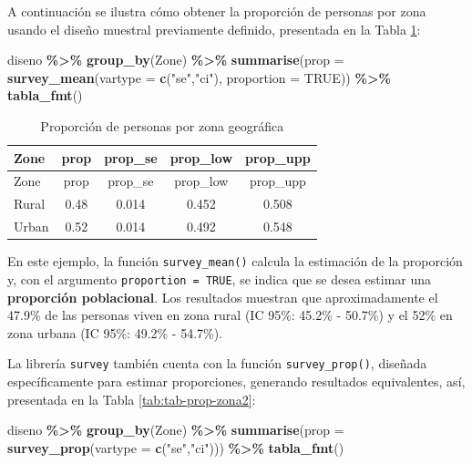 \documentclass[
  spanish,
  12pt,
]{book}
\newenvironment{Shaded}{\begin{snugshade}}{\end{snugshade}}
\newcommand{\AttributeTok}[1]{\textcolor[rgb]{0.13,0.29,0.53}{#1}}
\newcommand{\ConstantTok}[1]{\textcolor[rgb]{0.56,0.35,0.01}{#1}}
\newcommand{\FunctionTok}[1]{\textcolor[rgb]{0.13,0.29,0.53}{\textbf{#1}}}
\newcommand{\NormalTok}[1]{#1}
\newcommand{\SpecialCharTok}[1]{\textcolor[rgb]{0.81,0.36,0.00}{\textbf{#1}}}
\newcommand{\StringTok}[1]{\textcolor[rgb]{0.31,0.60,0.02}{#1}}
\begin{document}
A continuación se ilustra cómo obtener la proporción de personas por zona usando el diseño muestral previamente definido, presentada en la Tabla \ref{tab:tab-prop-zona}:

\begin{Shaded}
\begin{Highlighting}[]
\NormalTok{diseno }\SpecialCharTok{\%\textgreater{}\%} 
  \FunctionTok{group\_by}\NormalTok{(Zone) }\SpecialCharTok{\%\textgreater{}\%} 
  \FunctionTok{summarise}\NormalTok{(}\AttributeTok{prop =} \FunctionTok{survey\_mean}\NormalTok{(}\AttributeTok{vartype =} \FunctionTok{c}\NormalTok{(}\StringTok{"se"}\NormalTok{,}\StringTok{"ci"}\NormalTok{), }
                               \AttributeTok{proportion =} \ConstantTok{TRUE}\NormalTok{)) }\SpecialCharTok{\%\textgreater{}\%}
  \FunctionTok{tabla\_fmt}\NormalTok{()}
\end{Highlighting}
\end{Shaded}

\begin{longtable}[]{@{}lcccc@{}}
\caption{\label{tab:tab-prop-zona}Proporción de personas por zona geográfica}\tabularnewline
\toprule\noalign{}
Zone & prop & prop\_se & prop\_low & prop\_upp \\
\midrule\noalign{}
\endfirsthead
\toprule\noalign{}
Zone & prop & prop\_se & prop\_low & prop\_upp \\
\midrule\noalign{}
\endhead
\bottomrule\noalign{}
\endlastfoot
Rural & 0.48 & 0.014 & 0.452 & 0.508 \\
Urban & 0.52 & 0.014 & 0.492 & 0.548 \\
\end{longtable}

En este ejemplo, la función \texttt{survey\_mean()} calcula la estimación de la proporción y, con el argumento \texttt{proportion\ =\ TRUE}, se indica que se desea estimar una \textbf{proporción poblacional}. Los resultados muestran que aproximadamente el 47.9\% de las personas viven en zona rural (IC 95\%: 45.2\% - 50.7\%) y el 52\% en zona urbana (IC 95\%: 49.2\% - 54.7\%).

La librería \texttt{survey} también cuenta con la función \texttt{survey\_prop()}, diseñada específicamente para estimar proporciones, generando resultados equivalentes, así, presentada en la Tabla \ref{tab:tab-prop-zona2}:

\begin{Shaded}
\begin{Highlighting}[]
\NormalTok{diseno }\SpecialCharTok{\%\textgreater{}\%} 
  \FunctionTok{group\_by}\NormalTok{(Zone) }\SpecialCharTok{\%\textgreater{}\%} 
  \FunctionTok{summarise}\NormalTok{(}\AttributeTok{prop =} \FunctionTok{survey\_prop}\NormalTok{(}\AttributeTok{vartype =} \FunctionTok{c}\NormalTok{(}\StringTok{"se"}\NormalTok{,}\StringTok{"ci"}\NormalTok{))) }\SpecialCharTok{\%\textgreater{}\%}
  \FunctionTok{tabla\_fmt}\NormalTok{()}
\end{Highlighting}
\end{Shaded}
\end{document}
